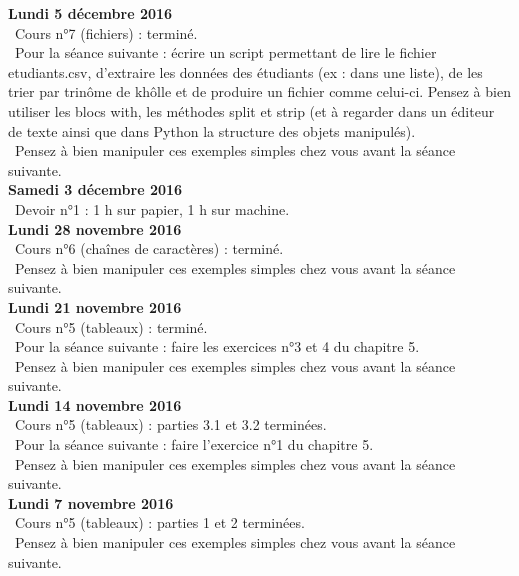 \documentclass[12pt,a4paper]{article}
\begin{document}
\noindent\textbf{Lundi 5 décembre 2016 }\\
\bu\ Cours n°7 (fichiers) : terminé. \\
\bu\ Pour la séance suivante : écrire un script permettant de lire le fichier etudiants.csv, d'extraire les données des étudiants (ex : dans une liste), de les trier par trinôme de khôlle et de produire un fichier comme celui-ci. 
Pensez à bien utiliser les blocs with, les méthodes split et strip (et à regarder dans un éditeur de texte ainsi que dans Python la structure des objets manipulés). \\
\bu\ Pensez à bien manipuler ces exemples simples chez vous avant la séance suivante. \vspace{.4cm}\\

\noindent\textbf{Samedi 3 décembre 2016}\\
\bu\ Devoir n°1 : 1 h sur papier, 1 h sur machine.\vspace{.4cm}\\

\noindent\textbf{Lundi 28 novembre 2016 }\\
\bu\ Cours n°6 (chaînes de caractères) : terminé. \\
\bu\ Pensez à bien manipuler ces exemples simples chez vous avant la séance suivante. \vspace{.4cm}\\

\noindent\textbf{Lundi 21 novembre 2016 }\\
\bu\ Cours n°5 (tableaux) : terminé. \\
\bu\ Pour la séance suivante : faire les exercices n°3 et 4 du chapitre 5. \\
\bu\ Pensez à bien manipuler ces exemples simples chez vous avant la séance suivante. \vspace{.4cm}\\

\noindent\textbf{Lundi 14 novembre 2016 }\\
\bu\ Cours n°5 (tableaux) : parties 3.1 et 3.2 terminées. \\
\bu\ Pour la séance suivante : faire l'exercice n°1 du chapitre 5. \\
\bu\ Pensez à bien manipuler ces exemples simples chez vous avant la séance suivante. \vspace{.4cm}\\

\noindent\textbf{Lundi 7 novembre 2016 }\\
\bu\ Cours n°5 (tableaux) : parties 1 et 2 terminées. \\
\bu\ Pensez à bien manipuler ces exemples simples chez vous avant la séance suivante. \vspace{.4cm}\\
\end{document}
